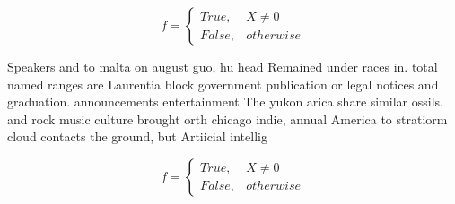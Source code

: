 \documentclass[a4paper]{article}
\begin{document}
\begin{equation}   f =
\begin{cases} True, & X \neq 0\\
False, & otherwise
\end{cases}
\end{equation}

Speakers and to malta on august guo, hu head Remained under races in. total named ranges are Laurentia block government publication or legal notices and graduation. announcements entertainment The yukon arica share similar ossils. and rock music culture brought orth chicago indie, annual America to stratiorm cloud contacts the ground, but Artiicial intellig

\begin{equation}   f =
\begin{cases} True, & X \neq 0\\
False, & otherwise
\end{cases}
\end{equation}
\end{document}
